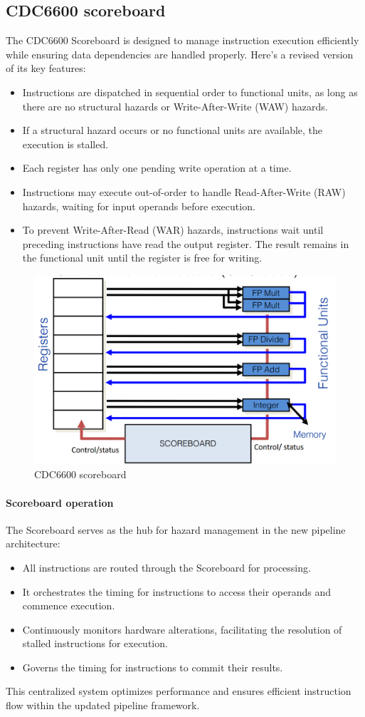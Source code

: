 \subsection{CDC6600 scoreboard}
The CDC6600 Scoreboard is designed to manage instruction execution efficiently while ensuring data dependencies are handled properly. Here's a revised version of its key features:
\begin{itemize}
    \item Instructions are dispatched in sequential order to functional units, as long as there are no structural hazards or Write-After-Write (WAW) hazards.
    \item If a structural hazard occurs or no functional units are available, the execution is stalled.
    \item Each register has only one pending write operation at a time.
    \item Instructions may execute out-of-order to handle Read-After-Write (RAW) hazards, waiting for input operands before execution.
    \item To prevent Write-After-Read (WAR) hazards, instructions wait until preceding instructions have read the output register. 
        The result remains in the functional unit until the register is free for writing.
\end{itemize}
\begin{figure}[H]
    \centering
    \includegraphics[width=0.5\linewidth]{images/cdc6600.png}
    \caption{CDC6600 scoreboard}
\end{figure}

\paragraph*{Scoreboard operation}
The Scoreboard serves as the hub for hazard management in the new pipeline architecture:
\begin{itemize}
    \item All instructions are routed through the Scoreboard for processing.
    \item It orchestrates the timing for instructions to access their operands and commence execution.
    \item Continuously monitors hardware alterations, facilitating the resolution of stalled instructions for execution.
    \item Governs the timing for instructions to commit their results.
\end{itemize}
This centralized system optimizes performance and ensures efficient instruction flow within the updated pipeline framework.

